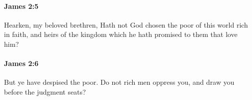 		\paragraph{James 2:5} %
			\label{JAMES-2-5}

			Hearken, my beloved brethren, Hath not God chosen the poor of this world rich in faith, and heirs of the kingdom which he hath promised to them that love him?

			\begin{framed}
			\scriptsize
				\begin{compactdesc}
					\item[SBLG] 
				\end{compactdesc}
			\end{framed}

		\paragraph{James 2:6} %
			\label{JAMES-2-6}

			But ye have despised the poor. Do not rich men oppress you, and draw you before the judgment seats?

